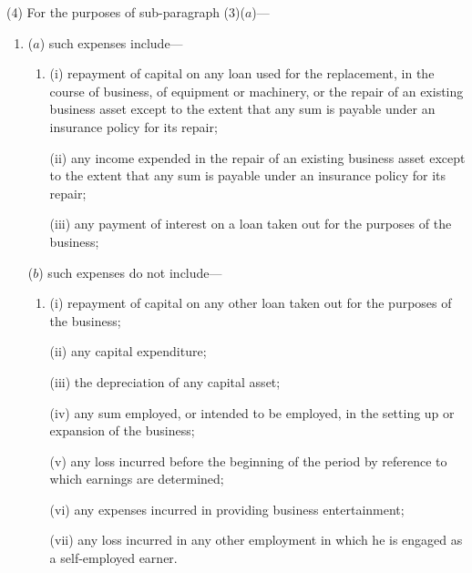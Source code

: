 \documentclass[12pt,a4paper]{article}
\begin{document}
(4) For the purposes of sub-paragraph (3)($a$)—
\begin{enumerate}\item[]
($a$) such expenses include—
\begin{enumerate}\item[]
(i) repayment of capital on any loan used for the replacement, in the course of business, of equipment or machinery, or the repair of an existing business asset except to the extent that any sum is payable under an insurance policy for its repair;

(ii) any income expended in the repair of an existing business asset except to the extent that any sum is payable under an insurance policy for its repair;

(iii) any payment of interest on a loan taken out for the purposes of the business;
\end{enumerate}

($b$) such expenses do not include—
\begin{enumerate}\item[]
(i) repayment of capital on any other loan taken out for the purposes of the business;

(ii) any capital expenditure;

(iii) the depreciation of any capital asset;

(iv) any sum employed, or intended to be employed, in the setting up or expansion of the business;

(v) any loss incurred before the beginning of the period by reference to which earnings are determined;

(vi) any expenses incurred in providing business entertainment;

(vii) any loss incurred in any other employment in which he is engaged as a self-employed earner.
\end{enumerate}
\end{enumerate}

\end{document}
